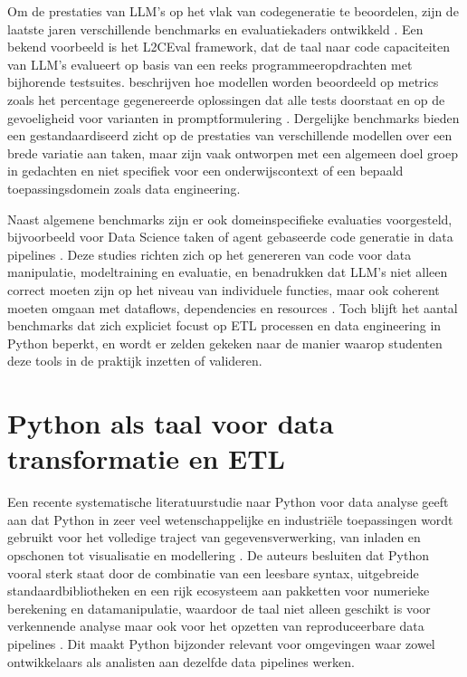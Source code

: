 Om de prestaties van LLM's op het vlak van codegeneratie te beoordelen, zijn de laatste jaren verschillende benchmarks en evaluatiekaders ontwikkeld \autocite{Ni2024}. Een bekend voorbeeld is het L2CEval framework, dat de taal naar code capaciteiten van LLM's evalueert op basis van een reeks programmeeropdrachten met bijhorende testsuites. \textcite{Ni2024} beschrijven hoe modellen worden beoordeeld op metrics zoals het percentage gegenereerde oplossingen dat alle tests doorstaat en op de gevoeligheid voor varianten in promptformulering \autocite{Ni2024}. Dergelijke benchmarks bieden een gestandaardiseerd zicht op de prestaties van verschillende modellen over een brede variatie aan taken, maar zijn vaak ontworpen met een algemeen doel groep in gedachten en niet specifiek voor een onderwijscontext of een bepaald toepassingsdomein zoals data engineering.

Naast algemene benchmarks zijn er ook domeinspecifieke evaluaties voorgesteld, bijvoorbeeld voor Data Science taken of agent gebaseerde code generatie in data pipelines \autocite{Nascimento2024}. Deze studies richten zich op het genereren van code voor data manipulatie, modeltraining en evaluatie, en benadrukken dat LLM's niet alleen correct moeten zijn op het niveau van individuele functies, maar ook coherent moeten omgaan met dataflows, dependencies en resources \autocite{Nascimento2024}. Toch blijft het aantal benchmarks dat zich expliciet focust op ETL processen en data engineering in Python beperkt, en wordt er zelden gekeken naar de manier waarop studenten deze tools in de praktijk inzetten of valideren.

\section{Python als taal voor data transformatie en ETL}
\label{sec:python-etl}

Een recente systematische literatuurstudie naar Python voor data analyse geeft aan dat Python in zeer veel wetenschappelijke en industriële toepassingen wordt gebruikt voor het volledige traject van gegevensverwerking, van inladen en opschonen tot visualisatie en modellering \autocite{Kabir2024}. De auteurs besluiten dat Python vooral sterk staat door de combinatie van een leesbare syntax, uitgebreide standaardbibliotheken en een rijk ecosysteem aan pakketten voor numerieke berekening en datamanipulatie, waardoor de taal niet alleen geschikt is voor verkennende analyse maar ook voor het opzetten van reproduceerbare data pipelines \autocite{Kabir2024}. Dit maakt Python bijzonder relevant voor omgevingen waar zowel ontwikkelaars als analisten aan dezelfde data pipelines werken.

